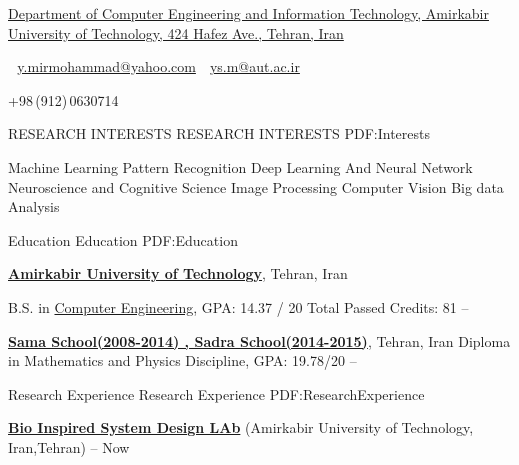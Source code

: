 \documentclass[letterpaper,MMMyyyy,nonstopmode]{simpleresumecv}
\newcommand{\CVAuthor}{ Yasaman Mirmohammad}
\newcommand{\CVWebpage}{}
\begin{document}

\Title{\CVAuthor}

\begin{SubTitle}
\href{https://www.google.com/maps/place/Amirkabir+University+of+Technology+(Polytechnic}
{Department of Computer Engineering and Information Technology, Amirkabir University of Technology, 424 Hafez Ave., Tehran, Iran}
\par
\,\SubBulletSymbol\,
\href{y.mirmohammad@yahoo.com}
{y.mirmohammad@yahoo.com}
\,\SubBulletSymbol\,
\href{ys.m@aut.ac.ir}
{ys.m@aut.ac.ir}
\,\SubBulletSymbol\,

+98\,(912)\,0630714
\,\SubBulletSymbol\,
\href{\CVWebpage}
{\url{\CVWebpage}}
\end{SubTitle}

\begin{Body}

\Section
{RESEARCH INTERESTS}
{RESEARCH INTERESTS}
{PDF:Interests}

\Entry

\BulletItem
Machine Learning
\BulletItem
Pattern Recognition
\BulletItem
Deep Learning And Neural Network
\BulletItem
Neuroscience and Cognitive Science
\BulletItem
Image Processing
\BulletItem
Computer Vision
\BulletItem
Big data Analysis



\Section
{Education}
{Education}
{PDF:Education}

\Entry
\href{http://www.aut.ac.ir}
{\textbf{Amirkabir University of Technology}},
Tehran, Iran

\Gap
\BulletItem
B.S. in
\href{http://ceit.aut.ac.ir}
{Computer Engineering}, 
  GPA: 14.37 / 20
  Total Passed Credits: 81
\hfill
{} --  

\href{}
{\textbf{Sama School(2008-2014) , Sadra School(2014-2015)}},
Tehran, Iran
\BulletItem
Diploma in Mathematics and Physics Discipline, 
GPA: 19.78/20
\hfill
{}--

\begin{Detail}

\end{Detail}


\BullENCE %

\Section
{Research Experience}
{Research Experience}
{PDF:ResearchExperience}

\Entry
\href{}
{\textbf{Bio Inspired System Design LAb}} 
\newline (Amirkabir University of Technology,
Iran,Tehran)
\hfill
{} --
Now


\end{Body}
\end{document}
